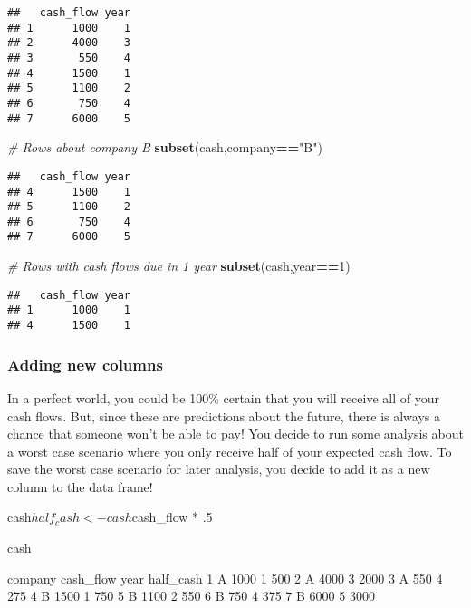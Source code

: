 \documentclass[]{article}
\newenvironment{Shaded}{\begin{snugshade}}{\end{snugshade}}
\newcommand{\KeywordTok}[1]{\textcolor[rgb]{0.13,0.29,0.53}{\textbf{#1}}}
\newcommand{\DecValTok}[1]{\textcolor[rgb]{0.00,0.00,0.81}{#1}}
\newcommand{\StringTok}[1]{\textcolor[rgb]{0.31,0.60,0.02}{#1}}
\newcommand{\CommentTok}[1]{\textcolor[rgb]{0.56,0.35,0.01}{\textit{#1}}}
\newcommand{\OperatorTok}[1]{\textcolor[rgb]{0.81,0.36,0.00}{\textbf{#1}}}
\newcommand{\NormalTok}[1]{#1}
\begin{document}
\begin{verbatim}
##   cash_flow year
## 1      1000    1
## 2      4000    3
## 3       550    4
## 4      1500    1
## 5      1100    2
## 6       750    4
## 7      6000    5
\end{verbatim}

\begin{Shaded}
\begin{Highlighting}[]
\CommentTok{# Rows about company B}
\KeywordTok{subset}\NormalTok{(cash,company}\OperatorTok{==}\StringTok{"B"}\NormalTok{)}
\end{Highlighting}
\end{Shaded}

\begin{verbatim}
##   cash_flow year
## 4      1500    1
## 5      1100    2
## 6       750    4
## 7      6000    5
\end{verbatim}

\begin{Shaded}
\begin{Highlighting}[]
\CommentTok{# Rows with cash flows due in 1 year}
\KeywordTok{subset}\NormalTok{(cash,year}\OperatorTok{==}\DecValTok{1}\NormalTok{)}
\end{Highlighting}
\end{Shaded}

\begin{verbatim}
##   cash_flow year
## 1      1000    1
## 4      1500    1
\end{verbatim}

\subsubsection{Adding new columns}\label{adding-new-columns}

In a perfect world, you could be 100\% certain that you will receive all
of your cash flows. But, since these are predictions about the future,
there is always a chance that someone won't be able to pay! You decide
to run some analysis about a worst case scenario where you only receive
half of your expected cash flow. To save the worst case scenario for
later analysis, you decide to add it as a new column to the data frame!

cash\(half_cash <- cash\)cash\_flow * .5

cash

company cash\_flow year half\_cash 1 A 1000 1 500 2 A 4000 3 2000 3 A
550 4 275 4 B 1500 1 750 5 B 1100 2 550 6 B 750 4 375 7 B 6000 5 3000
\end{document}
